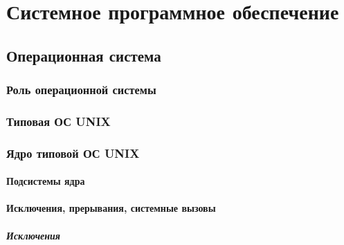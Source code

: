 \documentclass[oneside]{book}
\begin{document}
\cleardoublepage\clearpage



\tableofcontents


\part{Системное программное обеспечение}
%

	\chapter{Операционная система}
	
			
		\section{Роль операционной системы}
		
	
		\section{Типовая ОС UNIX}
		
	
		\section{Ядро типовой ОС UNIX}
		
		
			\subsection{Подсистемы ядра}
			
		
			\subsection{Исключения, прерывания, системные вызовы}
			
			
				\subsubsection{Исключения}
				
				
\end{document}
